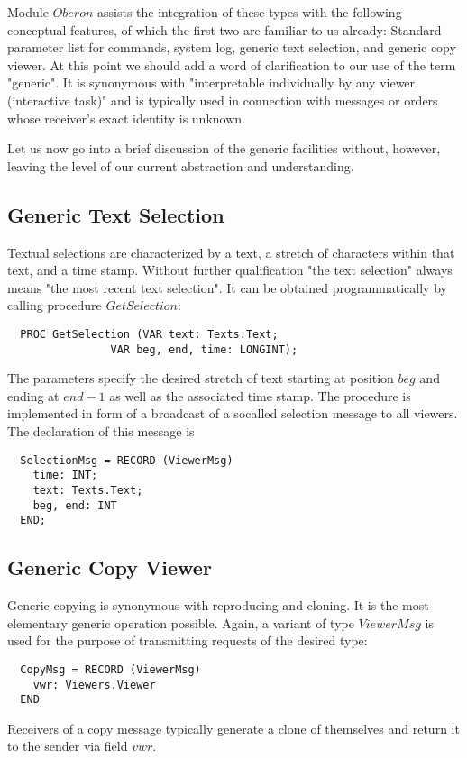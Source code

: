 Module $Oberon$ assists the integration of these types with the following conceptual features, of
which the first two are familiar to us already: Standard parameter list for commands, system log,
generic text selection, and generic copy viewer. At this point we should add a word of clarification
to our use of the term "generic". It is synonymous with "interpretable individually by any viewer
(interactive task)" and is typically used in connection with messages or orders whose receiver's
exact identity is unknown.

Let us now go into a brief discussion of the generic facilities without, however, leaving the level of
our current abstraction and understanding.

\subsection{Generic Text Selection}
Textual selections are characterized by a text, a stretch of characters within that text, and a time
stamp. Without further qualification "the text selection" always means "the most recent text selection". It can be obtained programmatically by calling procedure $GetSelection$:
\begin{verbatim}
  PROC GetSelection (VAR text: Texts.Text;
                VAR beg, end, time: LONGINT);
\end{verbatim}
The parameters specify the desired stretch of text starting at position $beg$ and ending at $end-1$ as
well as the associated time stamp. The procedure is implemented in form of a broadcast of a socalled selection message to all viewers. The declaration of this message is
\begin{verbatim}
  SelectionMsg = RECORD (ViewerMsg)
    time: INT;
    text: Texts.Text;
    beg, end: INT
  END;
\end{verbatim}

\subsection{Generic Copy Viewer}
Generic copying is synonymous with reproducing and cloning. It is the most elementary generic
operation possible. Again, a variant of type $ViewerMsg$ is used for the purpose of transmitting
requests of the desired type:
\begin{verbatim}
  CopyMsg = RECORD (ViewerMsg)
    vwr: Viewers.Viewer
  END
\end{verbatim}
Receivers of a copy message typically generate a clone of themselves and return it to the sender via field $vwr$.

